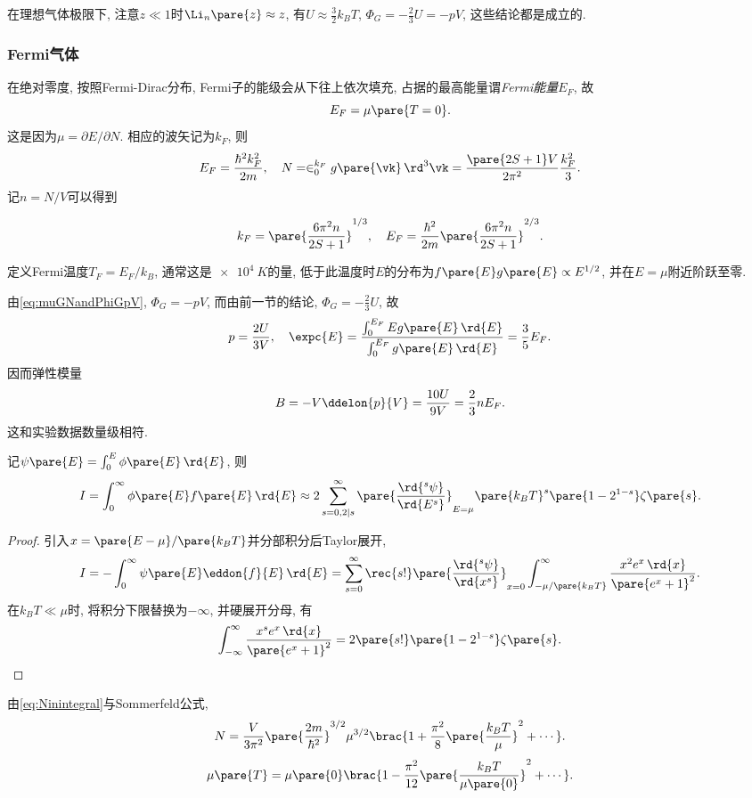 \documentclass[../Thermal.tex]{subfiles}
\begin{document}
\begin{ex}
在理想气体极限下, 注意$z\ll 1$时$\Li_n\pare{z}\approx z$, 有$U\approx \frac{3}{2}k_BT$, $\Phi_G = -\frac{2}{3}U = -pV$, 这些结论都是成立的.
\subsubsection{Fermi气体}
在绝对零度, 按照Fermi-Dirac分布, Fermi子的能级会从下往上依次填充, 占据的最高能量谓\emph{Fermi能量}$E_F$, 故
\[ E_F = \mu\pare{T=0}. \]
这是因为$\mu = \partial E/\partial N$. 相应的波矢记为$k_F$, 则
\[ E_F = \frac{\hbar^2k_F^2}{2m},\quad N = \in_0^{k_F} g\pare{\vk}\,\rd^3\vk = \frac{\pare{2S+1}V}{2\pi^2}\frac{k_F^2}{3}. \]
记$n=N/V$可以得到
\begin{finale}
\[ k_F = \pare{\frac{6\pi^2 n}{2S+1}}^{1/3},\quad E_F = \frac{\hbar^2}{2m}\pare{\frac{6\pi^2 n}{2S+1}}^{2/3}. \]
\end{finale}
\end{ex}
定义Fermi温度$T_F = E_F/k_B$, 通常这是$\SI{e4}{K}$的量, 低于此温度时$E$的分布为$f\pare{E}g\pare{E}\propto E^{1/2}$, 并在$E=\mu$附近阶跃至零.
\par
由\eqref{eq:muGNandPhiGpV}, $\Phi_G = -pV$, 而由前一节的结论, $\Phi_G = -\frac{2}{3}U$, 故
\[ p = \frac{2U}{3V},\quad \expc{E} = \frac{\int_0^{E_F}Eg\pare{E}\,\rd{E}}{\int_0^{E_F}g\pare{E}\,\rd{E}} = \frac{3}{5}E_F. \]
因而弹性模量
\[ B = -V\ddelon{p}{V} = \frac{10U}{9V} = \frac{2}{3}nE_F. \]
这和实验数据数量级相符.
\begin{theorem}[Sommerfeld公式]
记$\psi\pare{E} = \int_0^E\phi\pare{E}\,\rd{E}$, 则
\[ I = \int_0^\infty \phi\pare{E} f\pare{E}\,\rd{E} \approx 2 \sum_{s=0, 2|s}^\infty \pare{\frac{\rd{^s\psi}}{\rd{E^s}}}_{E=\mu}\pare{k_BT}^s\pare{1-2^{1-s}}\zeta\pare{s}. \]
\end{theorem}
\begin{proof}
引入$x = \pare{E-\mu}/\pare{k_BT}$并分部积分后Taylor展开,
\[ I = -\int_0^\infty \psi\pare{E}\eddon{f}{E}\,\rd{E} = \sum_{s=0}^\infty \rec{s!}\pare{\frac{\rd{^s\psi}}{\rd{x^s}}}_{x=0}\int_{-\mu/\pare{k_B T}}^\infty \frac{x^2e^x\,\rd{x}}{\pare{e^x+1}^2}. \]
在$k_B T\ll \mu$时, 将积分下限替换为$-\infty$, 并硬展开分母, 有
\[ \int_{-\infty}^\infty \frac{x^se^x\,\rd{x}}{\pare{e^x+1}^2} = 2\pare{s!}\pare{1-2^{1-s}}\zeta\pare{s}. \qedhere \]
\end{proof}
由\eqref{eq:Ninintegral}与Sommerfeld公式,
\[ N = \frac{V}{3\pi^2}\pare{\frac{2m}{\hbar^2}}^{3/2}\mu^{3/2}\brac{1+\frac{\pi^2}{8}\pare{\frac{k_BT}{\mu}}^2+\cdots}. \]
\[ \mu\pare{T} = \mu\pare{0}\brac{1-\frac{\pi^2}{12}\pare{\frac{k_BT}{\mu\pare{0}}}^2 + \cdots}. \]
\end{document}
